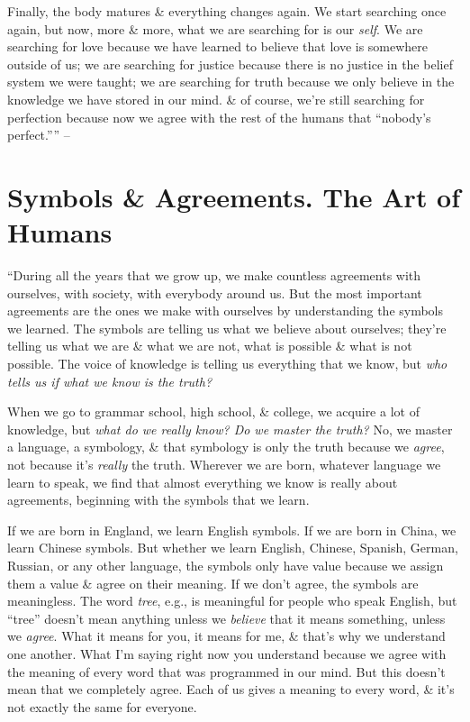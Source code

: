 \documentclass{article}
\numberwithin{equation}{section}
\begin{document}
Finally, the body matures \& everything changes again. We start searching once again, but now, more \& more, what we are searching for is our \textit{self}. We are searching for love because we have learned to believe that love is somewhere outside of us; we are searching for justice because there is no justice in the belief system we were taught; we are searching for truth because we only believe in the knowledge we have stored in our mind. \& of course, we're still searching for perfection because now we agree with the rest of the humans that ``nobody's perfect.'''' -- \cite[pp. 19--24]{Ruiz_Ruiz2011}


\section{Symbols \& Agreements. The Art of Humans}
``During all the years that we grow up, we make countless agreements with ourselves, with society, with everybody around us. But the most important agreements are the ones we make with ourselves by understanding the symbols we learned. The symbols are telling us what we believe about ourselves; they're telling us what we are \& what we are not, what is possible \& what is not possible. The voice of knowledge is telling us everything that we know, but \textit{who tells us if what we know is the truth?}

When we go to grammar school, high school, \& college, we acquire a lot of knowledge, but \textit{what do we really know? Do we master the truth?} No, we master a language, a symbology, \& that symbology is only the truth because we \textit{agree}, not because it's \textit{really} the truth. Wherever we are born, whatever language we learn to speak, we find that almost everything we know is really about agreements, beginning with the symbols that we learn.

If we are born in England, we learn English symbols. If we are born in China, we learn Chinese symbols. But whether we learn English, Chinese, Spanish, German, Russian, or any other language, the symbols only have value because we assign them a value \& agree on their meaning. If we don't agree, the symbols are meaningless. The word \textit{tree}, e.g., is meaningful for people who speak English, but ``tree'' doesn't mean anything unless we \textit{believe} that it means something, unless we \textit{agree}. What it means for you, it means for me, \& that's why we understand one another. What I'm saying right now you understand because we agree with the meaning of every word that was programmed in our mind. But this doesn't mean that we completely agree. Each of us gives a meaning to every word, \& it's not exactly the same for everyone.
\end{document}
